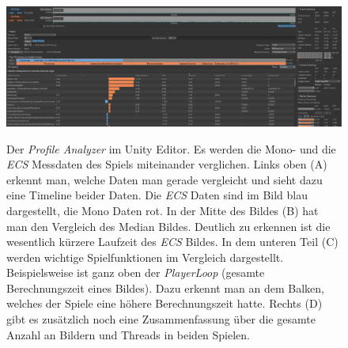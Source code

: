 \begin{figure}[H]
\centering
\begin{annotatedFigure}
	{\includegraphics[scale=0.31]{Bilder/Profile Analyzer.png}}
\end{annotatedFigure}
\caption[Der \textit{Profile Analyzer} im Unity Editor]{Der \textit{Profile Analyzer} im Unity Editor. Es werden die Mono- und die \textit{ECS} Messdaten des Spiels miteinander verglichen. Links oben (A) erkennt man, welche Daten man gerade vergleicht und sieht dazu eine Timeline beider Daten. Die \textit{ECS} Daten sind im Bild blau dargestellt, die Mono Daten rot. In der Mitte des Bildes (B) hat man den Vergleich des Median Bildes. Deutlich zu erkennen ist die wesentlich kürzere Laufzeit des \textit{ECS} Bildes. In dem unteren Teil (C) werden wichtige Spielfunktionen im Vergleich dargestellt. Beispielsweise ist ganz oben der \textit{PlayerLoop} (gesamte Berechnungszeit eines Bildes). Dazu erkennt man an dem Balken, welches der Spiele eine höhere Berechnungszeit hatte. Rechts (D) gibt es zusätzlich noch eine Zusammenfassung über die gesamte Anzahl an Bildern und Threads in beiden Spielen.}
\label{fig:profile_analyzer}
\end{figure}